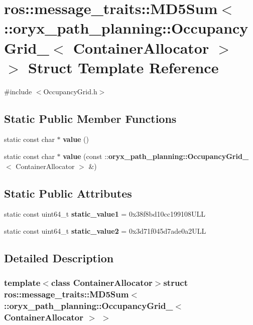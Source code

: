 \section{ros\-:\-:message\-\_\-traits\-:\-:\-M\-D5\-Sum$<$ \-:\-:oryx\-\_\-path\-\_\-planning\-:\-:\-Occupancy\-Grid\-\_\-$<$ \-Container\-Allocator $>$ $>$ \-Struct \-Template \-Reference}
\label{structros_1_1message__traits_1_1MD5Sum_3_01_1_1oryx__path__planning_1_1OccupancyGrid___3_01ContainerAllocator_01_4_01_4}


{\ttfamily \#include $<$\-Occupancy\-Grid.\-h$>$}

\subsection*{\-Static \-Public \-Member \-Functions}
\begin{DoxyCompactItemize}
\item 
static const char $\ast$ {\bf value} ()
\item 
static const char $\ast$ {\bf value} (const \-::{\bf oryx\-\_\-path\-\_\-planning\-::\-Occupancy\-Grid\-\_\-}$<$ \-Container\-Allocator $>$ \&)
\end{DoxyCompactItemize}
\subsection*{\-Static \-Public \-Attributes}
\begin{DoxyCompactItemize}
\item 
static const uint64\-\_\-t {\bf static\-\_\-value1} = 0x38f8bd10cc199108\-U\-L\-L
\item 
static const uint64\-\_\-t {\bf static\-\_\-value2} = 0x3d71f045d7ade0a2\-U\-L\-L
\end{DoxyCompactItemize}


\subsection{\-Detailed \-Description}
\subsubsection*{template$<$class Container\-Allocator$>$struct ros\-::message\-\_\-traits\-::\-M\-D5\-Sum$<$ \-::oryx\-\_\-path\-\_\-planning\-::\-Occupancy\-Grid\-\_\-$<$ Container\-Allocator $>$ $>$}



